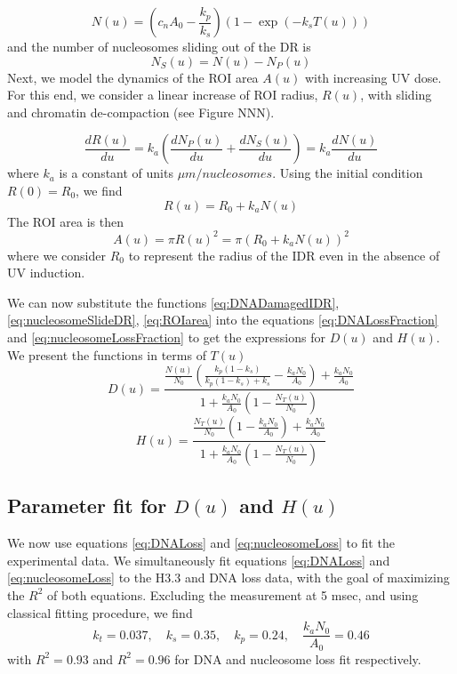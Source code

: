 \documentclass[12pt]{article}
\begin{document}
	\begin{equation}\label{eq:nucleosomeLossDR}
	N(u) = \left(c_nA_0-\frac{k_p}{k_s}\right)\left(1-\exp\left(-k_sT(u)\right)\right)
	\end{equation}	
	and the number of nucleosomes sliding out of the DR is 
	\begin{equation}\label{eq:nucleosomeSlideDR}
	N_S(u) = N(u)-N_P(u)
	\end{equation}
	Next, we model the dynamics of the ROI area $A(u)$ with increasing UV
	dose. For this end, we consider a linear increase of ROI radius, $R(u)$, with sliding and chromatin de-compaction (see Figure NNN). 
		
	\begin{equation*}
	\frac{dR(u)}{du}=k_a\left(\frac{dN_P(u)}{du}+\frac{dN_S(u)}{du}\right)= k_a\frac{dN(u)}{du}
	\end{equation*}
	where $k_a$ is a constant of units $\mu m/ nucleosomes$. Using the initial condition $R(0) = R_0$, we find
	\begin{equation}
	R(u) = R_0+ k_aN(u)
	\end{equation}
	The ROI area is then 
	\begin{equation}\label{eq:ROIarea}
	A(u)= \pi R(u)^2 = \pi (R_0+k_aN(u))^2
	\end{equation}
	where we consider $R_0$ to represent the radius of the IDR even in the absence of UV induction.
	
	We can now substitute the functions \eqref{eq:DNADamagedIDR}, \eqref{eq:nucleosomeSlideDR}, \eqref{eq:ROIarea} into the equations \eqref{eq:DNALossFraction} and \eqref{eq:nucleosomeLossFraction} to get the expressions for $D(u)$ and $H(u)$. We present the functions in terms of $T(u)$
	\begin{equation}\label{eq:DNALoss}
	D(u) = \frac{\frac{N(u)}{N_0}\left(\frac{k_p(1-k_s)}{k_p(1-k_s)+k_s}-\frac{k_aN_0}{A_0}\right)+\frac{k_aN_0}{A_0}}{1+\frac{k_aN_0}{A_0}\left(1-\frac{N_T(u)}{N_0}\right)}
	\end{equation}
	\begin{equation}\label{eq:nucleosomeLoss}
		H(u) = \frac{\frac{N_T(u)}{N_0}\left(1-\frac{k_aN_0}{A_0}\right)+\frac{k_aN_0}{A_0}}{1+\frac{k_aN_0}{A_0}\left(1-\frac{N_T(u)}{N_0}\right)}
	\end{equation}
	
	\subsection{Parameter fit for $D(u)$ and $H(u)$}\label{subsection:parameterFit}
	We now use equations \eqref{eq:DNALoss}  and \eqref{eq:nucleosomeLoss} to fit the experimental data. We simultaneously fit equations \eqref{eq:DNALoss}  and \eqref{eq:nucleosomeLoss} to the H3.3 and DNA loss data, with the goal of maximizing the $R^2$ of both equations. Excluding the measurement at 5 msec, and using classical fitting procedure, we find
	\begin{equation*}
	k_t = 0.037, \quad k_s = 0.35,\quad k_p = 0.24, \quad \frac{k_aN_0}{A_0} = 0.46
	\end{equation*}
	with $R^2 = 0.93$ and $R^2 = 0.96$ for DNA and nucleosome loss fit respectively.
	
\end{document}
